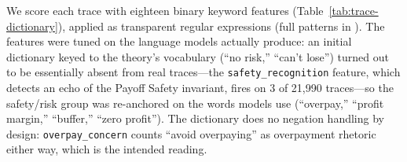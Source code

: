 We score each trace with eighteen binary keyword features (Table~\ref{tab:trace-dictionary}), applied as transparent regular expressions (full patterns in ). The features were tuned on the language models actually produce: an initial dictionary keyed to the theory's vocabulary (``no risk,'' ``can't lose'') turned out to be essentially absent from real traces---the \texttt{safety\_recognition} feature, which detects an echo of the Payoff Safety invariant, fires on 3 of 21{,}990 traces---so the safety/risk group was re-anchored on the words models use (``overpay,'' ``profit margin,'' ``buffer,'' ``zero profit''). The dictionary does no negation handling by design: \texttt{overpay\_concern} counts ``avoid overpaying'' as overpayment rhetoric either way, which is the intended reading.

